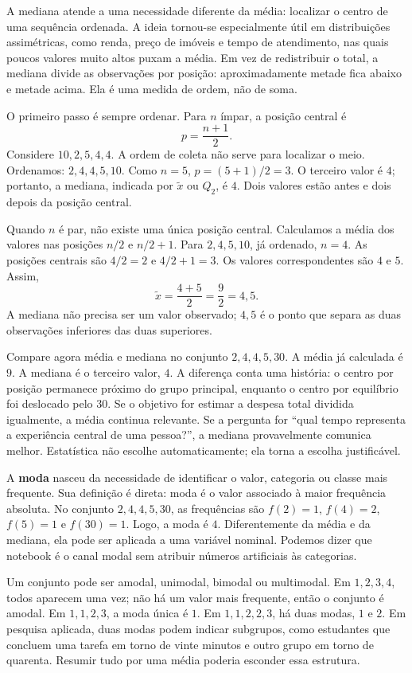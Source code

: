 A mediana atende a uma necessidade diferente da média: localizar o centro de uma sequência ordenada. A ideia tornou-se especialmente útil em distribuições assimétricas, como renda, preço de imóveis e tempo de atendimento, nas quais poucos valores muito altos puxam a média. Em vez de redistribuir o total, a mediana divide as observações por posição: aproximadamente metade fica abaixo e metade acima. Ela é uma medida de ordem, não de soma.

O primeiro passo é sempre ordenar. Para $n$ ímpar, a posição central é
\[
 p=\frac{n+1}{2}.
\]
Considere ${10,2,5,4,4}$. A ordem de coleta não serve para localizar o meio. Ordenamos: ${2,4,4,5,10}$. Como $n=5$, $p=(5+1)/2=3$. O terceiro valor é $4$; portanto, a mediana, indicada por $\widetilde{x}$ ou $Q_2$, é $4$. Dois valores estão antes e dois depois da posição central.

Quando $n$ é par, não existe uma única posição central. Calculamos a média dos valores nas posições $n/2$ e $n/2+1$. Para ${2,4,5,10}$, já ordenado, $n=4$. As posições centrais são $4/2=2$ e $4/2+1=3$. Os valores correspondentes são $4$ e $5$. Assim,
\[
\widetilde{x}=\frac{4+5}{2}=\frac{9}{2}=4{,}5.
\]
A mediana não precisa ser um valor observado; $4{,}5$ é o ponto que separa as duas observações inferiores das duas superiores.

Compare agora média e mediana no conjunto ${2,4,4,5,30}$. A média já calculada é $9$. A mediana é o terceiro valor, $4$. A diferença conta uma história: o centro por posição permanece próximo do grupo principal, enquanto o centro por equilíbrio foi deslocado pelo $30$. Se o objetivo for estimar a despesa total dividida igualmente, a média continua relevante. Se a pergunta for ``qual tempo representa a experiência central de uma pessoa?'', a mediana provavelmente comunica melhor. Estatística não escolhe automaticamente; ela torna a escolha justificável.

A \textbf{moda} nasceu da necessidade de identificar o valor, categoria ou classe mais frequente. Sua definição é direta: moda é o valor associado à maior frequência absoluta. No conjunto ${2,4,4,5,30}$, as frequências são $f(2)=1$, $f(4)=2$, $f(5)=1$ e $f(30)=1$. Logo, a moda é $4$. Diferentemente da média e da mediana, ela pode ser aplicada a uma variável nominal. Podemos dizer que notebook é o canal modal sem atribuir números artificiais às categorias.

Um conjunto pode ser amodal, unimodal, bimodal ou multimodal. Em ${1,2,3,4}$, todos aparecem uma vez; não há um valor mais frequente, então o conjunto é amodal. Em ${1,1,2,3}$, a moda única é $1$. Em ${1,1,2,2,3}$, há duas modas, $1$ e $2$. Em pesquisa aplicada, duas modas podem indicar subgrupos, como estudantes que concluem uma tarefa em torno de vinte minutos e outro grupo em torno de quarenta. Resumir tudo por uma média poderia esconder essa estrutura.

